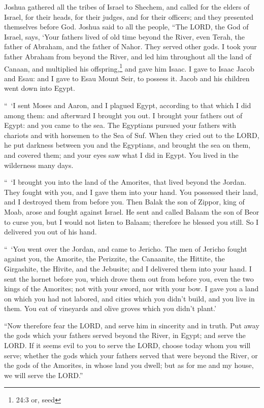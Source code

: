 \mychapter{} \myverse*{}Joshua gathered all the tribes of Israel to Shechem, and called
for the elders of Israel, for their heads, for their judges, and for their officers; and they presented
themselves before God.
\myverse{}Joshua said to all the people, “The LORD, the God of Israel, says, ‘Your fathers
lived of old time beyond the River, even Terah, the father of Abraham, and the father of Nahor. They served
other gods.
\myverse{}I took your father Abraham from beyond the River, and led him throughout all
the land of Canaan, and multiplied his offspring,\footnote{24:3 or, seed} and gave him Isaac.
\myverse{}I gave to Isaac Jacob and Esau: and I gave to Esau Mount Seir, to possess it.
Jacob and his children went down into Egypt.

\myverse{}“ ‘I sent Moses and Aaron, and I plagued Egypt, according to that
which I did among them: and afterward I brought you out.
\myverse{}I brought your fathers out of Egypt: and you came to the sea. The Egyptians
pursued your fathers with chariots and with horsemen to the Sea of Suf.
\myverse{}When they cried out to the LORD, he put darkness between you and the Egyptians,
and brought the sea on them, and covered them; and your eyes saw what I did in Egypt. You lived in the
wilderness many days.

\myverse{}“ ‘I brought you into the land of the Amorites, that lived beyond
the Jordan. They fought with you, and I gave them into your hand. You possessed their land, and I destroyed
them from before you.
\myverse{}Then Balak the son of Zippor, king of Moab, arose and fought against Israel.
He sent and called Balaam the son of Beor to curse you,
\myverse{}but I would not listen to Balaam; therefore he blessed you still. So I delivered
you out of his hand.

\myverse{}“ ‘You went over the Jordan, and came to Jericho. The men of
Jericho fought against you, the Amorite, the Perizzite, the Canaanite, the Hittite, the Girgashite, the
Hivite, and the Jebusite; and I delivered them into your hand.
\myverse{}I sent the hornet before you, which drove them out from before you, even
the two kings of the Amorites; not with your sword, nor with your bow.
\myverse{}I gave you a land on which you had not labored, and cities which you didn’t
build, and you live in them. You eat of vineyards and olive groves which you didn’t plant.’

\myverse{}“Now therefore fear the LORD, and serve him in sincerity and
in truth. Put away the gods which your fathers served beyond the River, in Egypt; and serve the LORD.
\myverse{}If it seems evil to you to serve the LORD, choose today whom you will serve;
whether the gods which your fathers served that were beyond the River, or the gods of the Amorites, in
whose land you dwell; but as for me and my house, we will serve the LORD.”


